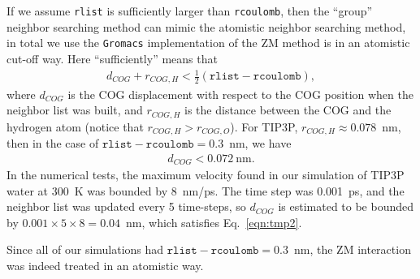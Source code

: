 \documentclass[aps,pre,preprint]{revtex4-1}
\newcommand{\gromacs}[0]{\texttt{Gromacs}}
\newcommand{\rlist}[0]{\texttt{rlist}}
\newcommand{\rcoulomb}[0]{\texttt{rcoulomb}}
\begin{document}
If we assume \rlist{} is sufficiently larger than \rcoulomb{}, then
the ``group'' neighbor searching method can mimic the atomistic
neighbor searching method, in total we use the \gromacs{}
implementation of the ZM method is in an atomistic cut-off way.
Here ``sufficiently'' means that
\begin{align}
  d_{COG} + r_{COG,H} < \frac12 (\rlist - \rcoulomb),
\end{align}
where $d_{COG}$ is the COG displacement with respect to the COG position
when the neighbor list was built, and $r_{COG,H}$ is the distance between
the COG and the hydrogen atom (notice that  $r_{COG,H} >  r_{COG,O}$).
For TIP3P, $r_{COG,H}\approx 0.078$~nm, then
in the case of $\rlist - \rcoulomb = 0.3$~nm, we have
\begin{align}\label{eqn:tmp2}
  d_{COG} < 0.072\ \textrm{nm}.
\end{align}
In the numerical tests, the maximum velocity found in our simulation
of TIP3P water at 300~K was bounded by 8~nm/ps. The time step was
0.001~ps, and the neighbor list was updated every 5 time-steps, so
$d_{COG}$ is estimated to be bounded by $0.001 \times 5 \times 8 = 0.04$~nm,
which satisfies Eq.~\eqref{eqn:tmp2}.

Since all of our simulations had $\rlist - \rcoulomb = 0.3$~nm, the ZM
interaction was indeed treated in an atomistic way.





\end{document}
